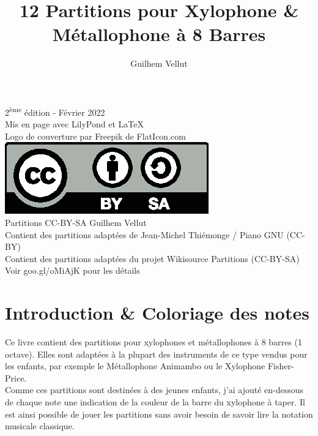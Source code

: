 \documentclass[17pt,letterpaper]{extarticle}
\title{12 Partitions pour Xylophone \& Métallophone à 8 Barres}
\author{Guilhem Vellut}
\date{}
\makeatletter
\def\clearleftpage{\clearpage\ifodd\c@page\else
\hbox{}\newpage\if@twocolumn\hbox{}\newpage\fi\fi}
\makeatother
\begin{document}
\pagestyle{empty}
\setcounter{secnumdepth}{-1}
\setcounter{page}{1}

\maketitle
\thispagestyle{empty}

\clearpage
\vspace*{\fill}

{\tiny 2\textsuperscript{ème} édition - Février 2022 \\ Mis en page avec LilyPond et \LaTeX \\
Logo de couverture par Freepik de FlatIcon.com\\
\newline
\includegraphics{by-sa} \\
\newline
Partitions CC-BY-SA Guilhem Vellut\\
Contient des partitions adaptées de Jean-Michel Thiémonge / Piano GNU (CC-BY)\\
Contient des partitions adaptées du projet Wikisource Partitions (CC-BY-SA)\\
Voir goo.gl/oMiAjK pour les détails \par}

\clearpage

\tableofcontents
\thispagestyle{empty}

\clearleftpage
\pagestyle{plain} 

\section{Introduction \& Coloriage des notes}

Ce livre contient des partitions pour xylophones et métallophones à 8 barres (1 octave). Elles sont adaptées à la plupart des instruments de ce type vendus pour les enfants, par exemple le Métallophone Animambo ou le Xylophone Fisher-Price.\\

Comme ces partitions sont destinées à des jeunes enfants, j'ai ajouté en-dessous de chaque note une indication de la couleur de la barre du xylophone à taper. Il est ainsi possible de jouer les partitions sans avoir besoin de savoir lire la notation musicale classique.\\
\end{document}
